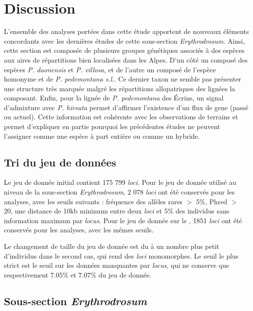 \section{Discussion}

L'ensemble des analyses portées dans cette étude apportent de nouveaux éléments concordants avec les dernières études de cette sous-section \textit{Erythrodrosum}. Ainsi, cette section est composée de plusieurs groupes génétiques associés à des espèces aux aires de répartitions bien localisées dans les Alpes. D'un côté un  composé des espèces \textit{P. daonensis} et \textit{P. villosa}, et de l'autre un  composé de l'espèce homonyme et de \textit{P. pedemontana s.l.}. Ce dernier taxon ne semble pas présenter une structure très marquée malgré les répartitions allopatriques des lignées la composant. Enfin, pour la lignée de \textit{P. pedemontana} des Écrins, un signal d'admixture avec \textit{P. hirsuta} permet d'affirmer l'existence d'un flux de gene (passé ou actuel). Cette information est cohérente avec les observations de terrains et permet d'expliquer en partie pourquoi les précédentes études ne peuvent l'assigner comme une espèce à part entière ou comme un hybride. 

\iffalse
\subsection{Tri du jeu de données}

Le jeu de donnée initial contient 175 799 \textit{loci}. Pour le jeu de donnée utilisé au niveau de la sous-section \textit{Erythrodrosum}, 2 078 \textit{loci} ont été conservés pour les analyses, avec les seuils suivants :  fréquence des allèles rares $>$ 5\%, Phred $>$ 20, une distance de 10kb minimum entre deux \textit{loci} et 5\% des individus sans information maximum par \textit{locus}.
Pour le jeu de donnée sur le , 1851 \textit{loci} ont été conservés pour les analyses, avec les mêmes seuils.

Le changement de taille du jeu de donnée est du à un nombre plus petit d'individus dans le second cas, qui rend des \textit{loci} monomorphes. Le seuil le plus strict est le seuil sur les données manquantes par \textit{locus}, qui ne conserve que  respectivement 7.05\% et 7.07\% du jeu de donnée. 

\subsection{Sous-section \textit{Erythrodrosum}}

